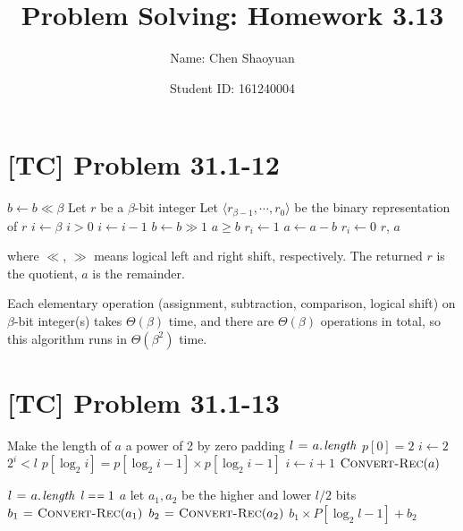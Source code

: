 \documentclass[a4paper,11pt,twocolumn]{article}
\newcommand{\homeworkno}{3.13}
\begin{document}
  \title{Problem Solving: Homework \homeworkno}
  \author{Name: Chen Shaoyuan \and Student ID: 161240004}
  \maketitle

  \section{[TC] Problem 31.1-12}
  \begin{codebox}
  \li $b \gets b \ll \beta$
  \li Let $r$ be a $\beta$-bit integer
  \li Let $\langle r_{\beta-1}, \cdots, r_0 \rangle$ be the binary representation of $r$
  \li $i \gets \beta$
  \li \While $i > 0$
  \li \Do $i \gets i - 1$
  \li     $b \gets b \gg 1$
  \li     \If $a \geq b$
  \li     \Do $r_i \gets 1$
  \li         $a \gets a - b$
  \li     \Else $r_i \gets 0$
          \End
      \End
  \li \Return $r$, $a$
  \end{codebox}
  where $\ll$, $\gg$ means logical left and right shift, respectively. The returned $r$ is the quotient, $a$ is the remainder.

  Each elementary operation (assignment, subtraction, comparison, logical shift) on $\beta$-bit integer(s) takes $\Theta(\beta)$ time, and there are $\Theta(\beta)$ operations in total, so this algorithm runs in $\Theta(\beta^2)$ time.

  \section{[TC] Problem 31.1-13}
  \begin{codebox}
  \li Make the length of $a$ a power of 2 by zero padding
  \li $l \gets \attrib{a}{length}$
  \li $p[0] = 2$
  \li $i \gets 2$
  \li \While $2^i < l$
  \li \Do $p[\log_2 i] = p[\log_2 i - 1] \times p[\log_2 i - 1] $
  \li     $i \gets i + 1$
      \End
  \li \Return $\textnormal{\scshape Convert-Rec}(a)$
  \end{codebox}
  
  \begin{codebox}
  \li $l \gets \attrib{a}{length}$
  \li \If $l \isequal 1$
  \li \Do \Return $a$
      \End
  \li let $a_1, a_2$ be the higher and lower $l/2$ bits
  \li $b_1 \mathrel{\hspace{1pt}=\hspace{1pt}} \textnormal{\scshape Convert-Rec}(a_1)$
  \li $b_2 \mathrel{\hspace{1pt}=\hspace{1pt}} \textnormal{\scshape Convert-Rec}(a_2)$
  \li \Return $b_1 \times P[\log_2 l - 1] + b_2$ 
  \end{codebox}
  
\end{document}
